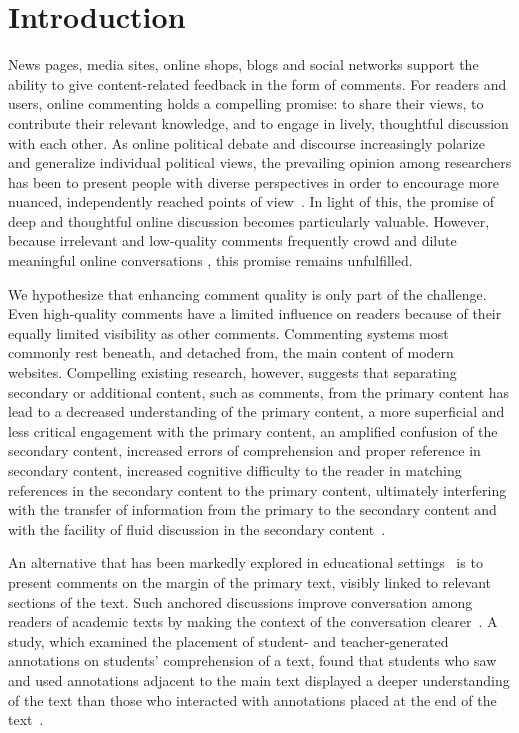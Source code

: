 \section{Introduction}

News pages, media sites, online shops, blogs and social networks support the ability to give content-related feedback in the form of comments. For readers and users, online commenting holds a compelling promise: to share their views, to contribute their relevant knowledge, and to engage in lively, thoughtful discussion with each other. As online political debate and discourse increasingly polarize and generalize individual political views, the prevailing opinion among researchers has been to present people with diverse perspectives in order to encourage more nuanced, independently reached points of view~\cite{ConsiderIt,Politics,NewsCube}. In light of this, the promise of deep and thoughtful online discussion becomes particularly valuable. However, because irrelevant and low-quality comments frequently crowd and dilute meaningful online conversations \cite{CommentQuality, FlamingCommunications}, this promise remains unfulfilled.

We hypothesize that enhancing comment quality is only part of the challenge. Even high-quality comments have a limited influence on readers because of their equally limited visibility as other comments. Commenting systems most commonly rest beneath, and detached from, the main content of modern websites. Compelling existing research, however, suggests that separating secondary or additional content, such as comments, from the primary content has lead to a decreased understanding of the primary content, a more superficial and less critical engagement with the primary content, an amplified confusion of the secondary content, increased errors of comprehension and proper reference in secondary content, increased cognitive difficulty to the reader in matching references in the secondary content to the primary content, ultimately interfering with the transfer of information from the primary to the secondary content and with the facility of fluid discussion in the secondary content~\cite{Brush,Guzdial,van,AnnotationsStudents,NewsInterfaces,FluidDocs,NB}.

An alternative that has been markedly explored in educational settings~\cite{Brush,Guzdial,van,AnnotationsStudents} is to present comments on the margin of the primary text, visibly linked to relevant sections of the text. Such anchored discussions improve conversation among readers of academic texts by making the context of the conversation clearer~\cite{Brush,Guzdial,van}. A study, which examined the placement of student- and teacher-generated annotations on students' comprehension of a text, found that students who saw and used annotations adjacent to the main text displayed a deeper understanding of the text than those who interacted with annotations placed at the end of the text~\cite{AnnotationsStudents}.


